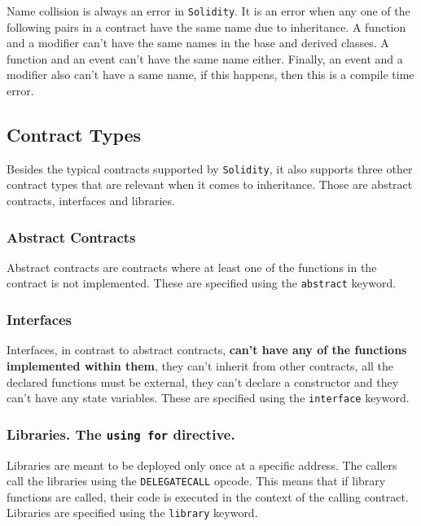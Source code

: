 Name collision is always an error in \texttt{Solidity}. It is an error
when any one of the following pairs in a contract have the same name due
to inheritance. A function and a modifier can't have the same names in
the base and derived classes. A function and an event can't have the
same name either. Finally, an event and a modifier also can't have a
same name, if this happens, then this is a compile time error.

\subsection{Contract Types}\label{contract-types}

Besides the typical contracts supported by \texttt{Solidity}, it also
supports three other contract types that are relevant when it comes to
inheritance. Those are abstract contracts, interfaces and libraries.

\subsubsection{Abstract Contracts}\label{abstract-contracts}

Abstract contracts are contracts where at least one of the functions in
the contract is not implemented. These are specified using the
\texttt{abstract} keyword.

\subsubsection{Interfaces}\label{interfaces}

Interfaces, in contrast to abstract contracts, \textbf{can't have any of
the functions implemented within them}, they can't inherit from other
contracts, all the declared functions must be external, they can't
declare a constructor and they can't have any state variables. These are
specified using the \texttt{interface} keyword.

\subsubsection{\texorpdfstring{Libraries. The \texttt{using\ for}
directive.}{Libraries. The using for directive.}}\label{libraries.-the-using-for-directive.}

Libraries are meant to be deployed only once at a specific address. The
callers call the libraries using the \texttt{DELEGATECALL} opcode. This
means that if library functions are called, their code is executed in
the context of the calling contract. Libraries are specified using the
\texttt{library} keyword.

